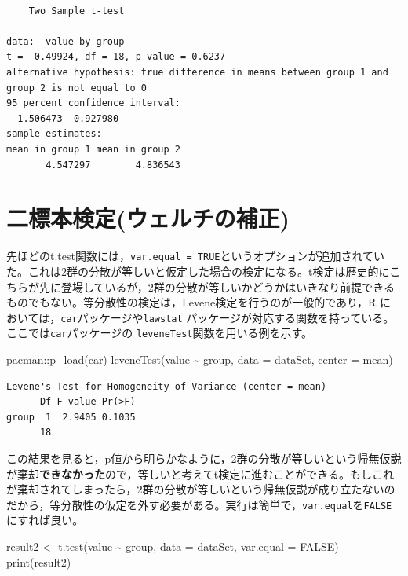 \documentclass[
  a4paper,
]{ltjsbook}
\newenvironment{Shaded}{\begin{snugshade}}{\end{snugshade}}
\newcommand{\AttributeTok}[1]{\textcolor[rgb]{0.40,0.45,0.13}{#1}}
\newcommand{\ConstantTok}[1]{\textcolor[rgb]{0.56,0.35,0.01}{#1}}
\newcommand{\FunctionTok}[1]{\textcolor[rgb]{0.28,0.35,0.67}{#1}}
\newcommand{\NormalTok}[1]{\textcolor[rgb]{0.00,0.23,0.31}{#1}}
\newcommand{\OtherTok}[1]{\textcolor[rgb]{0.00,0.23,0.31}{#1}}
\newcommand{\SpecialCharTok}[1]{\textcolor[rgb]{0.37,0.37,0.37}{#1}}
\begin{document}
\begin{verbatim}

    Two Sample t-test

data:  value by group
t = -0.49924, df = 18, p-value = 0.6237
alternative hypothesis: true difference in means between group 1 and group 2 is not equal to 0
95 percent confidence interval:
 -1.506473  0.927980
sample estimates:
mean in group 1 mean in group 2 
       4.547297        4.836543 
\end{verbatim}

\section{二標本検定(ウェルチの補正)}\label{ux4e8cux6a19ux672cux691cux5b9aux30a6ux30a7ux30ebux30c1ux306eux88dcux6b63}

先ほどのt.test関数には，\texttt{var.equal\ =\ TRUE}というオプションが追加されていた。これは2群の分散が等しいと仮定した場合の検定になる。t検定は歴史的にこちらが先に登場しているが，2群の分散が等しいかどうかはいきなり前提できるものでもない。等分散性の検定は，Levene検定を行うのが一般的であり，R
においては，\texttt{car}パッケージや\texttt{lawstat}
パッケージが対応する関数を持っている。ここでは\texttt{car}パッケージの
\texttt{leveneTest}関数を用いる例を示す。

\begin{Shaded}
\begin{Highlighting}[]
\NormalTok{pacman}\SpecialCharTok{::}\FunctionTok{p\_load}\NormalTok{(car)}
\FunctionTok{leveneTest}\NormalTok{(value }\SpecialCharTok{\textasciitilde{}}\NormalTok{ group, }\AttributeTok{data =}\NormalTok{ dataSet, }\AttributeTok{center =}\NormalTok{ mean)}
\end{Highlighting}
\end{Shaded}

\begin{verbatim}
Levene's Test for Homogeneity of Variance (center = mean)
      Df F value Pr(>F)
group  1  2.9405 0.1035
      18               
\end{verbatim}

この結果を見ると，p値から明らかなように，2群の分散が等しいという帰無仮説が棄却\textbf{できなかった}ので，等しいと考えてt検定に進むことができる。もしこれが棄却されてしまったら，2群の分散が等しいという帰無仮説が成り立たないのだから，等分散性の仮定を外す必要がある。実行は簡単で，\texttt{var.equal}を\texttt{FALSE}にすれば良い。

\begin{Shaded}
\begin{Highlighting}[]
\NormalTok{result2 }\OtherTok{\textless{}{-}} \FunctionTok{t.test}\NormalTok{(value }\SpecialCharTok{\textasciitilde{}}\NormalTok{ group, }\AttributeTok{data =}\NormalTok{ dataSet, }\AttributeTok{var.equal =} \ConstantTok{FALSE}\NormalTok{)}
\FunctionTok{print}\NormalTok{(result2)}
\end{Highlighting}
\end{Shaded}
\end{document}

